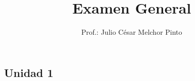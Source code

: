 \documentclass[12pt,addpoints]{evalua}
\title{Examen General}
\author{Prof.: Julio César Melchor Pinto}
\begin{document}
\tableofcontents
\newpage%
\begin{questions}
   \section*{Unidad 1}
   \question[10]

\end{questions}
\end{document}

